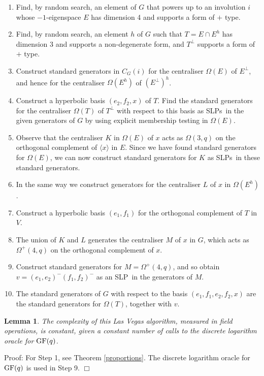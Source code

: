\documentclass[12pt]{article}
\newtheorem{lemma}[definition]{Lemma}
\newenvironment{proof}{\normalsize {\sc Proof}:}{{\hfill $\Box$ \\}}
\def\GF{{\rm GF}}
\def\SLP{{\rm SLP}}
\def\SLPs{{\rm SLPs}}
\begin{document}
\begin{enumerate}
\item  Find, by random search, an element of $G$ that powers up to an 
involution $i$ whose $-1$-eigenspace $E$ has dimension 4
and supports a form of $+$ type.

\item  Find, by random search, an element $h$ of $G$ such that 
$T=E\cap E^h$ has dimension 3 
and supports a non-degenerate form, and $T^\perp$ supports a form of $+$ type.

\item  Construct standard generators in $C_G(i)$ for the 
centraliser $\Omega(E)$ of $E^\perp$, 
and hence for the centraliser $\Omega(E^h)$ of $(E^\perp)^h$.

\item  Construct a hyperbolic basis $(e_2,f_2,x)$ of $T$. Find 
the standard generators for the centraliser $\Omega(T)$ of $T^\perp$ 
with respect to this basis as \SLPs\ in the given generators of 
$G$ by using explicit membership testing in $\Omega(E)$.

\item Observe that the centraliser $K$ in $\Omega(E)$ of $x$
acts as $\Omega(3,q)$ on the orthogonal complement 
of $\langle x\rangle$ in $E$.
Since we have found standard generators for $\Omega(E)$, we can now 
construct standard generators for $K$ as \SLPs\ in these standard generators. 

\item  In the same way we construct generators for the centraliser 
$L$ of $x$ in $\Omega(E^h)$.

\item Construct a hyperbolic basis $(e_1,f_1)$ for the orthogonal 
complement of $T$ in $V$.

\item  The union of $K$ and $L$ generates the 
centraliser $M$ of $x$ in $G$, which acts as $\Omega^+(4,q)$ on 
the orthogonal complement of $x$.  

\item Construct standard generators for $M = \Omega^+(4, q)$, and so
obtain $v=(e_1,e_2)^-(f_1,f_2)^-$ as an \SLP\ in the generators of $M$.

\item  The standard generators of $G$ with respect to the basis 
$(e_1,f_1,e_2,f_2,x)$ are the standard generators 
for $\Omega(T)$, together with $v$.
\end{enumerate}

\begin{lemma}
The complexity of this Las Vegas algorithm, 
measured in field operations, is constant,
given a constant number of calls to 
the discrete logarithm oracle for $\GF(q)$.
\end{lemma}
\begin{proof}
For Step 1, see Theorem \ref{proportions}.
The discrete logarithm oracle for $\GF(q)$ is used in Step 9.
\end{proof}
\end{document}

